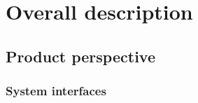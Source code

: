 \section{Overall description}


\subsection{Product perspective}


\subsubsection{System interfaces}


